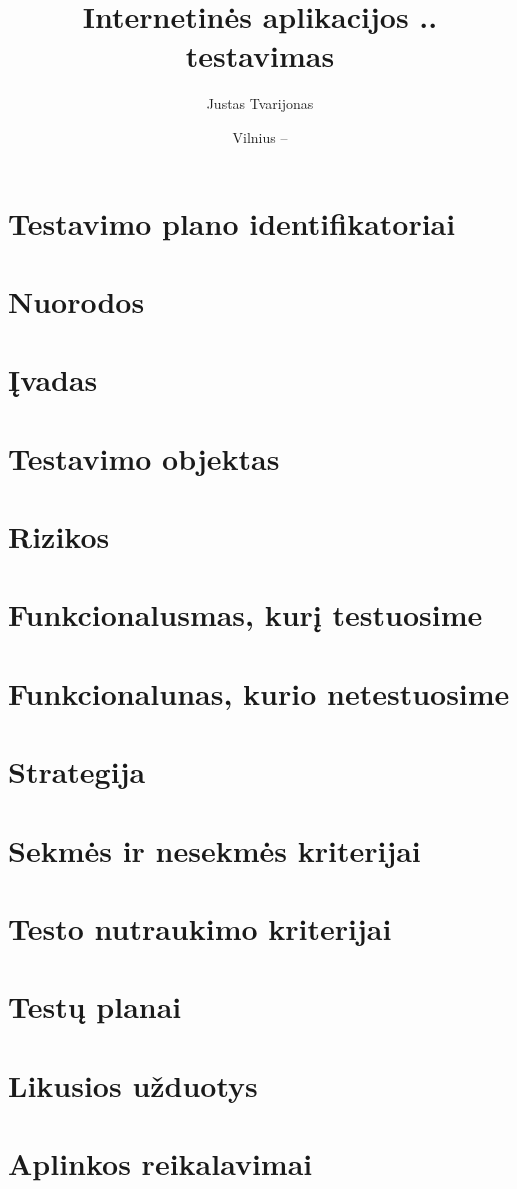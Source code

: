 \documentclass{VUMIFPSkursinis}
\title{Internetinės aplikacijos .. testavimas}
\author{Justas Tvarijonas}
\date{Vilnius – \the\year}
\begin{document}
\maketitle
{}
\tableofcontents
{}
\section{Testavimo plano identifikatoriai}
\section{Nuorodos}
\section{Įvadas}
\section{Testavimo objektas}
\section{Rizikos}
\section{Funkcionalusmas, kurį testuosime}
\section{Funkcionalunas, kurio netestuosime}
\section{Strategija}
\section{Sekmės ir nesekmės kriterijai}
\section{Testo nutraukimo kriterijai}
\section{Testų planai}
\section{Likusios užduotys}
\section{Aplinkos reikalavimai}
\end{document}
